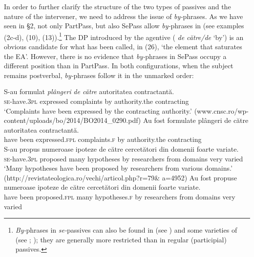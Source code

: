 \documentclass[output=paper]{langsci/langscibook}
\begin{document}
  In order to further clarify the structure of the two types of passives and the nature of the intervener, we need to address the issue of \textit{by-}phrases. As we have seen in §2, not only PartPass, but also SePass allow \textit{by-}phrases in  (see examples (2c-d), (10), (13)).\footnote{\textit{By-}phrases in \textit{se-}passives can also be found in  (see \citealt{MacDonald2017}) and some varieties of  (see \citealt{Authier1996}; \citealt{Zribi-Hertz2008}); they are generally more restricted than in regular (participial) passives.}  The DP introduced by the agentive  ( \textit{de către\slash de} ‘by’) is an obvious candidate for what has been called, in (26), ‘the element that saturates the EA’. However, there is no evidence that \textit{by-}phrases in SePass occupy a different position than in PartPass. In both configurations, when the subject remains postverbal, \textit{by-}phrases follow it in the unmarked order: 

\ea%
    \label{ex:giurgea:29}
    \begin{xlista}[m'.]
    \ex
    \gll  S-au             {formulat} \emph{plângeri}     \emph{de către} autoritatea     contractantă.\\
          \textsc{se-}have.\textsc{3pl} expressed complaints by          authority.the contracting\\
    \glt  ‘Complaints have been expressed by the contracting authority.’ (www.cnsc.ro/wp-content/uploads/bo/2014/BO2014\_0290.pdf)
    \gll Au   fost  formulate        plângeri          {de către} autoritatea    contractantă.\\
         have been expressed.\textsc{fpl} complaints.\textsc{f} by          authority.the contracting\\
    \ex
    \gll S-au           propus    numeroase ipoteze {de către} cercetători din domenii foarte variate.\\
         \textsc{se-}have.\textsc{3pl} proposed many        hypotheses by    researchers from domains very varied\\
    \glt ‘Many hypotheses have been proposed by researchers from various domains.’ (http://revistateologica.ro/vechi/articol.php?r=79\& a=4952)
    \gll Au  fost    propuse   numeroase ipoteze      {de către} cercetători din domenii foarte variate.\\
         have been proposed.\textsc{fpl} many hypotheses.\textsc{f} by    researchers from domains very varied\\
    \end{xlista}
\z    
\end{document}
